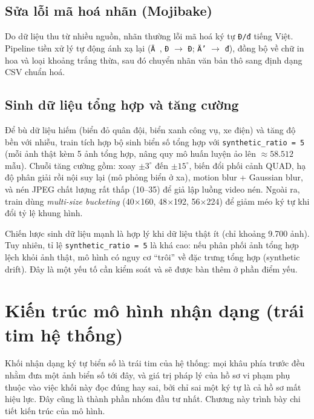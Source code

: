 \documentclass[12pt,a4paper]{report}
\begin{document}
\section{Sửa lỗi mã hoá nhãn (Mojibake)}
Do dữ liệu thu từ nhiều nguồn, nhãn thường lỗi mã hoá ký tự \texttt{Đ/đ} tiếng Việt. Pipeline tiền xử lý tự động ánh xạ lại (\texttt{Ä }, \texttt{Ð} $\rightarrow$ \texttt{Đ}; \texttt{Ä'} $\rightarrow$ \texttt{đ}), đồng bộ về chữ in hoa và loại khoảng trắng thừa, sau đó chuyển nhãn văn bản thô sang định dạng CSV chuẩn hoá.

\section{Sinh dữ liệu tổng hợp và tăng cường}
Để bù dữ liệu hiếm (biển đỏ quân đội, biển xanh công vụ, xe điện) và tăng độ bền với nhiễu, train tích hợp bộ sinh biển số tổng hợp với \texttt{synthetic\_ratio = 5} (mỗi ảnh thật kèm 5 ảnh tổng hợp, nâng quy mô huấn luyện ảo lên $\approx 58.512$ mẫu). Chuỗi tăng cường gồm: xoay $\pm3^\circ$ đến $\pm15^\circ$, biến đổi phối cảnh QUAD, hạ độ phân giải rồi nội suy lại (mô phỏng biển ở xa), motion blur + Gaussian blur, và nén JPEG chất lượng rất thấp (10--35) để giả lập luồng video nén. Ngoài ra, train dùng \emph{multi-size bucketing} (40$\times$160, 48$\times$192, 56$\times$224) để giảm méo ký tự khi đổi tỷ lệ khung hình.

Chiến lược sinh dữ liệu mạnh là hợp lý khi dữ liệu thật ít (chỉ khoảng 9.700 ảnh). Tuy nhiên, tỉ lệ \texttt{synthetic\_ratio = 5} là khá cao: nếu phân phối ảnh tổng hợp lệch khỏi ảnh thật, mô hình có nguy cơ ``trôi'' về đặc trưng tổng hợp (synthetic drift). Đây là một yếu tố cần kiểm soát và sẽ được bàn thêm ở phần điểm yếu.

\chapter{Kiến trúc mô hình nhận dạng (trái tim hệ thống)}

Khối nhận dạng ký tự biển số là trái tim của hệ thống: mọi khâu phía trước đều nhằm đưa một ảnh biển số tới đây, và giá trị pháp lý của hồ sơ vi phạm phụ thuộc vào việc khối này đọc đúng hay sai, bởi chỉ sai một ký tự là cả hồ sơ mất hiệu lực. Đây cũng là thành phần nhóm đầu tư nhất. Chương này trình bày chi tiết kiến trúc của mô hình.
\end{document}
